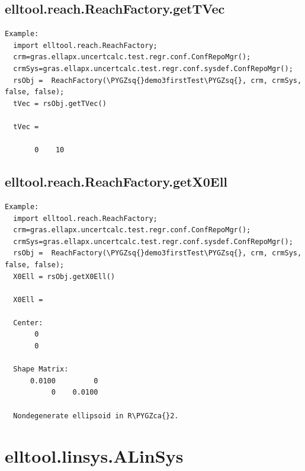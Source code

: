 \documentclass[letterpaper,10pt,english]{sphinxmanual}
\def\PYGZca{\char`\^}
\def\PYGZsq{\char`\'}
\begin{document}
\subsection{elltool.reach.ReachFactory.getTVec}
\label{chap_functions:elltool-reach-reachfactory-gettvec}
\begin{Verbatim}[commandchars=\\\{\}]
Example:
  import elltool.reach.ReachFactory;
  crm=gras.ellapx.uncertcalc.test.regr.conf.ConfRepoMgr();
  crmSys=gras.ellapx.uncertcalc.test.regr.conf.sysdef.ConfRepoMgr();
  rsObj =  ReachFactory(\PYGZsq{}demo3firstTest\PYGZsq{}, crm, crmSys, false, false);
  tVec = rsObj.getTVec()

  tVec =

       0    10
\end{Verbatim}


\subsection{elltool.reach.ReachFactory.getX0Ell}
\label{chap_functions:elltool-reach-reachfactory-getx0ell}
\begin{Verbatim}[commandchars=\\\{\}]
Example:
  import elltool.reach.ReachFactory;
  crm=gras.ellapx.uncertcalc.test.regr.conf.ConfRepoMgr();
  crmSys=gras.ellapx.uncertcalc.test.regr.conf.sysdef.ConfRepoMgr();
  rsObj =  ReachFactory(\PYGZsq{}demo3firstTest\PYGZsq{}, crm, crmSys, false, false);
  X0Ell = rsObj.getX0Ell()

  X0Ell =

  Center:
       0
       0

  Shape Matrix:
      0.0100         0
           0    0.0100

  Nondegenerate ellipsoid in R\PYGZca{}2.
\end{Verbatim}


\section{elltool.linsys.ALinSys}
\label{chap_functions:elltool-linsys-alinsys}
\end{document}
